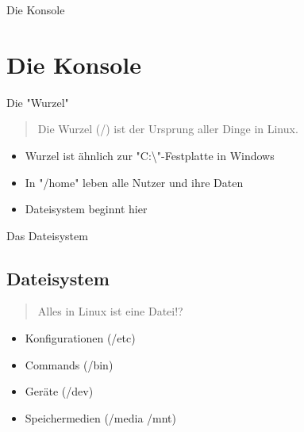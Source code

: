 
\begin{frame}{Die Konsole}
    \section{Die Konsole}\label{sec:die-konsole}
\end{frame}

\begin{frame}{Die "Wurzel"}

    \begin{quote}
        Die Wurzel (/) ist der Ursprung aller Dinge in Linux.
    \end{quote}

    \begin{itemize}
        \item Wurzel ist ähnlich zur "C:\textbackslash"-Festplatte in Windows
        \item In "/home" leben alle Nutzer und ihre Daten
        \item Dateisystem beginnt hier
    \end{itemize}

\end{frame}

\begin{frame}{Das Dateisystem}
    \subsection{Dateisystem}\label{subsec:dateisystem}

    \begin{quote}
        Alles in Linux ist eine Datei!?
    \end{quote}

    \begin{itemize}
        \item Konfigurationen (/etc)
        \item Commands (/bin)
        \item Geräte (/dev)
        \item Speichermedien (/media /mnt)
    \end{itemize}

\end{frame}

